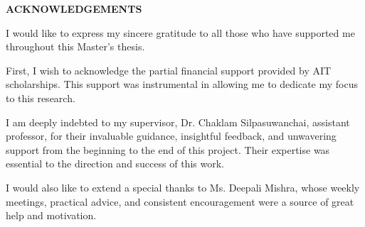 {}
\begin{center}
    \large{\bf ACKNOWLEDGEMENTS}
\end{center}

I would like to express my sincere gratitude to all those who have supported me throughout this Master's thesis.

First, I wish to acknowledge the partial financial support provided by AIT scholarships. This support was instrumental in allowing me to dedicate my focus to this research.

I am deeply indebted to my supervisor, Dr. Chaklam Silpasuwanchai, assistant professor, for their invaluable guidance, insightful feedback, and unwavering support from the beginning to the end of this project. Their expertise was essential to the direction and success of this work.

I would also like to extend a special thanks to Ms. Deepali Mishra, whose weekly meetings, practical advice, and consistent encouragement were a source of great help and motivation.